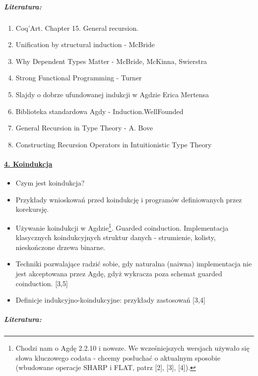 \documentclass[10pt, a4paper]{article}
\begin{document}
\subparagraph{Literatura:}

\begin{enumerate}
\addtolength{\itemsep}{-0.5\baselineskip}

 \item
     Coq’Art. Chapter 15. General recursion.

\item
    Unification by structural induction - McBride
\item
    Why Dependent Types Matter - McBride, McKinna, Swierstra
\item
    Strong Functional Programming - Turner
\item
    Slajdy o dobrze ufundowanej indukcji w Agdzie Erica Mertensa
\item
    Biblioteka standardowa Agdy - Induction.WellFounded
\item
    General Recursion in Type Theory - A. Bove
\item
    Constructing Recursion Operators in Intuitionistic Type Theory
 
\end{enumerate}


\paragraph{\underline{4. Koindukcja}} 

\begin{itemize}
\addtolength{\itemsep}{-0.5\baselineskip}

 \item Czym jest koindukcja?
 \item Przykłady wnioskowań przed koindukcję i programów definiowanych przez korekursję.
 \item Używanie koindukcji w Agdzie\footnote{
Chodzi nam o Agdę 2.2.10 i nowsze. We wcześniejszych wersjach używało się słowa kluczowego codata - chcemy posłuchać o aktualnym sposobie (wbudowane operacje SHARP i FLAT, patrz [2], [3], [4]).
}. Guarded coinduction. Implementacja klasycznych koindukcyjnych struktur danych - strumienie, kolisty, nieskończone drzewa binarne.
 \item Techniki pozwalające radzić sobie, gdy naturalna (naiwna) implementacja nie jest akceptowana przez Agdę, gdyż wykracza poza schemat guarded coinduction. [3,5]
 \item Definicje indukcyjno-koindukcyjne: przykłady zastosowań [3,4]
\end{itemize}

\subparagraph{Literatura:}
\end{document}
